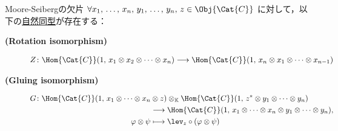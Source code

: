 \documentclass[TQFT_main]{subfiles}
\begin{document}
\begin{mylem}[label=lem:MS]{Moore-Seibergの欠片}
    $\forall x_1,\, \dots,\, x_n,\, y_1,\, \dots,\, y_n,\, z \in \Obj{\Cat{C}}$ に対して，以下の\hyperref[def:nat]{自然同型}が存在する：
    \begin{description}
        \item[\textbf{(Rotation isomorphism)}]
        \begin{align}
            Z \colon \Hom{\Cat{C}} (1,\, x_1 \otimes x_2 \otimes \cdots \otimes x_n) \lto \Hom{\Cat{C}} (1,\, x_n \otimes x_1 \otimes \cdots \otimes x_{n-1})
        \end{align}
        
        \item[\textbf{(Gluing isomorphism)}]
        \begin{align}
            G \colon \Hom{\Cat{C}} (1,\, x_1 \otimes \cdots \otimes x_n &\otimes z) \otimes_{\mathbb{K}}  \Hom{\Cat{C}}(1,\, z^* \otimes y_1 \otimes \cdots \otimes y_n) \\
            &\lto \Hom{\Cat{C}} (1,\, x_1\otimes \cdots \otimes x_{n} \otimes y_1 \otimes \cdots \otimes y_n), \\
            \varphi \otimes \psi &\lmto \lev_z \circ (\varphi \otimes \psi)
        \end{align}
        
    \end{description}
    
\end{mylem}
\end{document}
